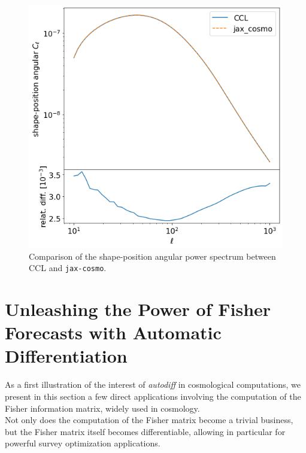 \documentclass[twocolumn,twocolappendix,nofootinbib,iop]{openjournal}
\newcommand{\jaxcosmo}{\texttt{jax-cosmo}}
\begin{document}
\begin{figure}
    \centering
    \includegraphics[width=\columnwidth]{figures/comp_Cell_shape_pos.png}
    \caption{Comparison of the shape-position angular power spectrum between CCL and \jaxcosmo.} 
    \label{fig:Cell_comparison}
\end{figure}


\section{Unleashing the Power of Fisher Forecasts with Automatic Differentiation}
\label{sec-fisher-forecast}

As a first illustration of the interest of \textit{autodiff} in cosmological computations, we present in this section a few direct applications involving the computation of the Fisher information matrix, widely used in cosmology. \\
Not only does the computation of the Fisher matrix become a trivial business, but the Fisher matrix itself becomes differentiable, allowing in particular for powerful survey optimization applications.

\end{document}
